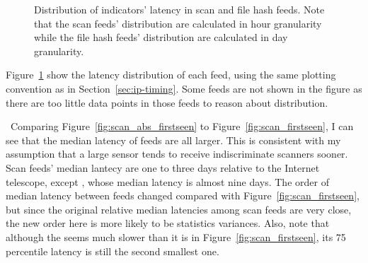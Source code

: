 \begin{figure}[t!]
\centering
{}


\caption{Distribution of indicators' latency in scan and file hash feeds.
Note that the scan feeds' distribution are calculated in hour granularity while
the file hash feeds' distribution are calculated in day granularity.}
\label{fig:abs_firstseen}
\end{figure}


Figure~\ref{fig:abs_firstseen} show the latency distribution of each feed, using
the same plotting convention as in Section~\ref{sec:ip-timing}. Some feeds are not
shown in the figure as there are too little data points in those feeds to reason
about distribution.

\finding\
Comparing Figure~\ref{fig:scan_abs_firstseen} to Figure~\ref{fig:scan_firstseen},
I can see that the median latency of feeds are all larger. This is consistent with
my assumption that a large sensor tends to receive indiscriminate scanners sooner.
Scan feeds' median lantecy are one to three days relative to the Internet telescope,
except {\feedTSAnalyst}, whose median latency is almost nine days.
The order of median latency between feeds changed compared with Figure~\ref{fig:scan_firstseen},
but since the original relative median latencies among scan feeds are very close,
the new order here is more likely to be statistics variances. Also, note that
although the {\feedTSAlienVault} seems much slower than it is in
Figure~\ref{fig:scan_firstseen}, its 75 percentile latency is still the second
smallest one.


